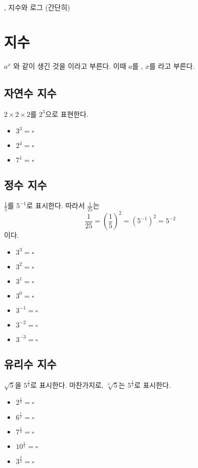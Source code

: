 \documentclass[a4paper,twocolumn]{article}
\begin{document}
\begin{center}
, 지수와 로그 (간단히)
\end{center}

\section{지수}
\(a^x\)
와 같이 생긴 것을 이라고 부른다.
이때 \(a\)를 , \(x\)를 라고 부른다.

%
\subsection{자연수 지수}
\(2\times 2\times 2\)를 \(2^3\)으로 표현한다.
\begin{itemize}
\item
\(3^3=\square\)
\item
\(2^4=\square\)
\item
\(7^1=\square\)
\end{itemize}

%
\subsection{정수 지수}
\(\frac15\)를 \(5^{-1}\)로 표시한다.
따라서 \(\frac1{25}\)는
\[\frac1{25}=\left(\frac15\right)^2=(5^{-1})^2=5^{-2}\]
이다.
\begin{itemize}
\item
\(3^3=\square\)
\item
\(3^2=\square\)
\item
\(3^1=\square\)
\item
\(3^0=\square\)
\item
\(3^{-1}=\square\)
\item
\(3^{-2}=\square\)
\item
\(3^{-3}=\square\)
\end{itemize}

%
\subsection{유리수 지수}
\(\sqrt5\)을 \(5^{\frac12}\)로 표시한다.
마찬가지로, \(\sqrt[3]5\)는 \(5^{\frac13}\)로 표시한다.
\begin{itemize}
\item
\(2^{\frac12}=\square\)
\item
\(6^{\frac12}=\square\)
\item
\(7^{\frac13}=\square\)
\item
\(10^{\frac15}=\square\)
\item
\(3^{\frac32}=\square\)
\end{itemize}
\end{document}
